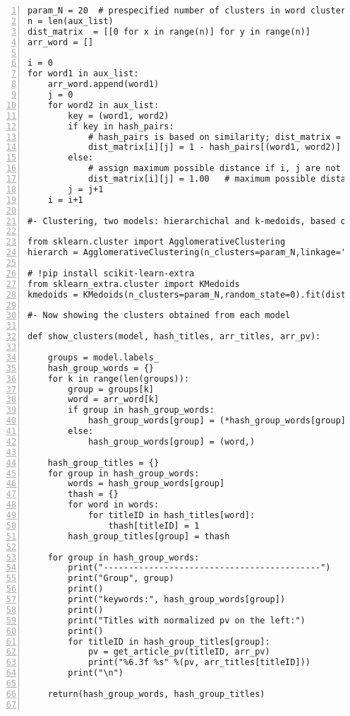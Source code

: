 \documentclass[oneside,10pt]{book}
\begin{document}
\begin{lstlisting}[numbers=left]
param_N = 20  # prespecified number of clusters in word clustering
n = len(aux_list)
dist_matrix  = [[0 for x in range(n)] for y in range(n)] 
arr_word = []

i = 0
for word1 in aux_list:
    arr_word.append(word1)
    j = 0
    for word2 in aux_list:
        key = (word1, word2)
        if key in hash_pairs:
            # hash_pairs is based on similarity; dist_matrix = 1 - hash_pairs is distance
            dist_matrix[i][j] = 1 - hash_pairs[(word1, word2)]
        else:
            # assign maximum possible distance if i, j are not linked
            dist_matrix[i][j] = 1.00   # maximum possible distance
        j = j+1
    i = i+1

#- Clustering, two models: hierarchichal and k-medoids, based on distance matrix

from sklearn.cluster import AgglomerativeClustering
hierarch = AgglomerativeClustering(n_clusters=param_N,linkage='average').fit(dist_matrix)

# !pip install scikit-learn-extra 
from sklearn_extra.cluster import KMedoids
kmedoids = KMedoids(n_clusters=param_N,random_state=0).fit(dist_matrix)

#- Now showing the clusters obtained from each model 

def show_clusters(model, hash_titles, arr_titles, arr_pv):

    groups = model.labels_
    hash_group_words = {}
    for k in range(len(groups)):
        group = groups[k]
        word = arr_word[k]
        if group in hash_group_words:
            hash_group_words[group] = (*hash_group_words[group], word)
        else:
            hash_group_words[group] = (word,)

    hash_group_titles = {}
    for group in hash_group_words:
        words = hash_group_words[group]
        thash = {}
        for word in words:
            for titleID in hash_titles[word]: 
                thash[titleID] = 1
        hash_group_titles[group] = thash

    for group in hash_group_words:
        print("-------------------------------------------")
        print("Group", group)
        print()
        print("keywords:", hash_group_words[group])
        print()
        print("Titles with normalized pv on the left:")
        print()
        for titleID in hash_group_titles[group]:
            pv = get_article_pv(titleID, arr_pv)
            print("%6.3f %s" %(pv, arr_titles[titleID]))
        print("\n")
 
    return(hash_group_words, hash_group_titles)


\end{lstlisting}
\end{document}
